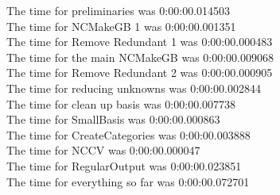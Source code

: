 \documentclass[rep10,leqno]{report}
\begin{document}
\noindent
The time for preliminaries was 0:00:00.014503\\
The time for NCMakeGB 1 was 0:00:00.001351\\
The time for Remove Redundant 1 was 0:00:00.000483\\
The time for the main NCMakeGB was 0:00:00.009068\\
The time for Remove Redundant 2 was 0:00:00.000905\\
The time for reducing unknowns was 0:00:00.002844\\
The time for clean up basis was 0:00:00.007738\\
The time for SmallBasis was 0:00:00.000863\\
The time for CreateCategories was 0:00:00.003888\\
The time for NCCV was 0:00:00.000047\\
The time for RegularOutput was 0:00:00.023851\\
The time for everything so far was 0:00:00.072701\\
\end{document}
